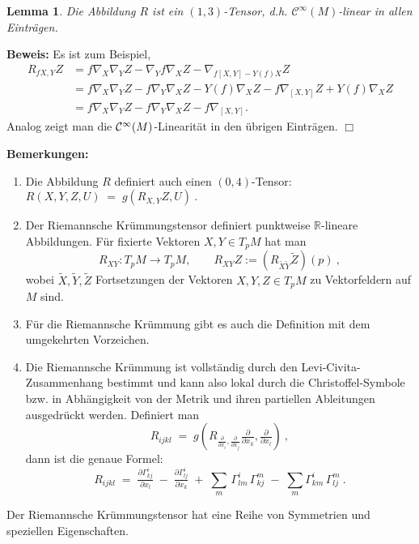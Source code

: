 \documentclass[12pt,a4paper]{article}
\def\R{\mathbb{R}}
\newtheorem{Lemma}{Lemma}[section]
\def\proof{\noindent\textbf{Beweis:}\quad}
\def\qed{\quad\hfill\ensuremath{\Box}}
\begin{document}
\bigskip

\begin{Lemma}
Die Abbildung $R$ ist ein $(1,3)$-Tensor, d.h. $\mathcal C^\infty(M)$-linear
in allen Eintr\"agen.
\end{Lemma}
\proof
Es ist zum Beispiel,
\begin{align*}
R_{fX,Y}Z &= f\nabla_X \nabla_Y Z - \nabla_Y f\nabla_X Z -
\nabla_{f[X,Y]-Y(f)X}Z\\
&= f\nabla_X \nabla_Y Z - f\nabla_Y \nabla_X Z
- Y(f)\nabla_X Z - f\nabla_{[X,Y]}Z+ Y(f)\nabla_XZ\\
&= f\nabla_X \nabla_Y Z - f\nabla_Y \nabla_X Z
-f\nabla_{[X,Y]}.
\end{align*}
Analog zeigt man die $\mathcal{C}^\infty(M)$-Linearit\"at in den \"ubrigen Eintr\"agen.
\qed

\bigskip

{\bf Bemerkungen:}
\begin{enumerate}
 \item
Die Abbildung $R$ definiert auch einen $(0,4)$-Tensor:
$
R(X, Y, Z, U) \;=\;  g(R_{X,Y}Z, U) \ .
$
 \item
Der Riemannsche Kr\"ummungstensor definiert punktweise $\R$-lineare Abbildungen.
F\"ur fixierte Vektoren $X,Y \in T_pM$ hat man
$$
R_{X Y} : T_pM \rightarrow T_pM, \qquad R_{X Y}Z := (R_{\tilde X \tilde Y} \tilde Z)(p) \ ,
$$
wobei $\tilde X, \tilde Y, \tilde Z$ Fortsetzungen der Vektoren $X, Y, Z \in T_p M$ zu
Vektorfeldern auf $M$ sind.
\item
F\"ur die Riemannsche Kr\"ummung gibt es auch die Definition mit dem umgekehrten Vorzeichen.
\item
Die Riemannsche Kr\"ummung ist vollst\"andig durch den Levi-Civita-Zusammenhang bestimmt und
kann also lokal durch die Christoffel-Symbole bzw. in Abh\"angigkeit von der Metrik und
ihren partiellen Ableitungen ausgedr\"uckt werden. Definiert man
$$
R_{ijkl} \;= \;
g(R_{\frac{\partial}{\partial x_i}, \frac{\partial}{\partial x_j} }
\tfrac{\partial}{\partial x_k}, \tfrac{\partial}{\partial x_l}) \ ,
$$
dann ist die genaue Formel:
$$
R_{ijkl} \;= \;
\tfrac{\partial \Gamma^i_{k j}}{\partial x_l}
\;-\;
\tfrac{\partial \Gamma^i_{lj}}{\partial x_k}
\;+\;
\sum_m \, \Gamma^i_{lm} \, \Gamma^m_{k j}
\;-\;
\sum_m \Gamma^i_{km} \, \Gamma^m_{l j} \ .
$$

\end{enumerate}


\bigskip

Der Riemannsche Kr\"ummungstensor hat eine Reihe von Symmetrien
und speziellen Eigenschaften.
\end{document}
